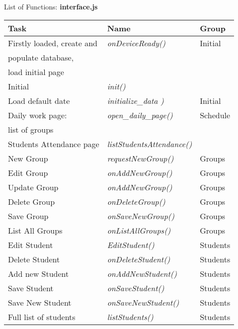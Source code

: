 \begin{bclogo}[couleur=orange!30,logo=\bcbook, arrondi=0.1,ombre=true ] 
{List of Functions: {\bf interface.js}}	
\begin{tabular}{lll}
Task                    & Name            & Group \\
\hline
Firstly loaded, create and    & \emph{ onDeviceReady()  }& Initial\\
populate database,              &   &                       \\
load initial page               &   &                       \\
Initial                         &   \emph{ init()  } & \\
Load default date               &  \emph{ initialize\_data )      } & Initial \\
Daily work page:                &   \emph{open\_daily\_page()     } & Schedule \\
list of groups                  &                         &  \\
Students Attendance page        &  \emph{ listStudentsAttendance() }&   \\
New Group                       &  \emph{ requestNewGroup()     }   & Groups \\
Edit Group                      &  \emph{ onAddNewGroup()       }   & Groups \\
Update Group                    &  \emph{ onAddNewGroup()       }   & Groups \\
Delete Group                    &  \emph{ onDeleteGroup()       }   & Groups \\    
Save Group                      &  \emph{ onSaveNewGroup()      }   & Groups \\
List All Groups                 &  \emph{ onListAllGroups()     }   & Groups \\
Edit Student                    &  \emph{ EditStudent()         }   & Students \\
Delete Student                  &  \emph{ onDeleteStudent()     }   & Students \\   
Add new Student                 &  \emph{ onAddNewStudent()     }   & Students \\    
Save Student                    &  \emph{ onSaveStudent()       }   & Students \\
Save New Student                &  \emph{ onSaveNewStudent()    }   &  Students \\
Full list of students           &  \emph{ listStudents()        }   & Students \\

\end{tabular}
\end{bclogo}
